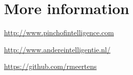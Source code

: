 \documentclass[a4paper, oneside, final]{scrartcl}
\begin{document}
\def \mytopseperator {-5pt}



\section{More information}
\begin{description}[align=left,noitemsep,topsep=\mytopseperator]

  \item [Personal blog] \url{http://www.pinchofintelligence.com}
   \item [Collaborative blog] \url{http://www.andereintelligentie.nl/}
  \item [Github] \url{https://github.com/rmeertens}
\end{description}
\end{document}
